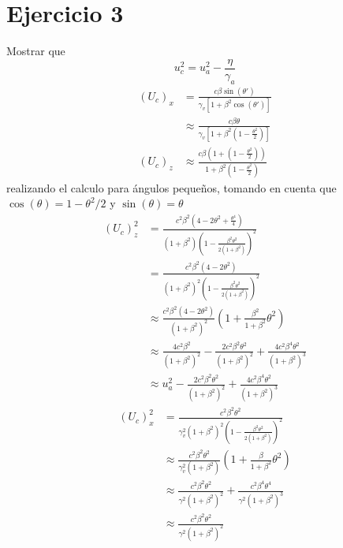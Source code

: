 \section*{Ejercicio 3}
Mostrar que
    \begin{equation*}
        u_c^2 = u_a^2 - \frac{\eta}{\gamma_a}
    \end{equation*}
    \begin{align*}
        (U_c)_x &= \frac{c\beta \sin({\theta}')}{\gamma_v \left[1+\beta^2 \cos({\theta}') \right]}\\
        & \approx \frac{c \beta  \theta}{\gamma_v \left[1+\beta^2 \left(1- \frac{\theta^2}{2} \right) \right]}\\
        (U_c)_z & \approx \frac{c \beta (1+\left(1-\frac{\theta^2}{2} \right))}{1+\beta^2\left(1-\frac{\theta^2}{2}\right)}
    \end{align*}
    realizando el calculo para ángulos pequeños, tomando en cuenta que $\cos(\theta)=1-\theta^2/2$ y $\sin(\theta)=\theta$
    \begin{align*}
        (U_c)_z^2 &= \frac{c^2 \beta^2 \left(4-2\theta^2+\frac{\theta^4}{4}\right)}{(1+\beta^2)\left(1- \frac{\beta^2 \theta^2}{2(1+\beta^2)}\right)^2}\\
        & = \frac{c^2 \beta^2 (4-2\theta^2)}{(1+\beta^2)^2 \left(1- \frac{\beta^2 \theta^2 }{2(1+\beta^2)}\right)^2}\\
        & \approx \frac{c^2 \beta^2 (4-2\theta^2)}{(1+\beta^2)^2} \left(1+ \frac{\beta^2}{1+\beta^2}\theta^2 \right)\\
        & \approx \frac{4c^2 \beta^2}{(1+\beta^2)^2} - \frac{2c^2 \beta^2 \theta^2}{(1+\beta^2)^2} + \frac{4c^2 \beta^4 \theta^2}{(1+\beta^2)^3}\\
        & \approx u_a^2 - \frac{2c^2 \beta^2 \theta^2}{(1+\beta^2)^2} + \frac{4c^2 \beta^4 \theta^2}{(1+\beta^2)^3} 
    \end{align*}
    \begin{align*}
        (U_c)_x^2 &= \frac{c^2 \beta^2 \theta^2}{\gamma_v^2 (1+\beta^2)^2 \left(1-\frac{\beta^2 \theta^2}{2(1+\beta^2)} \right)^2}\\
        &\approx \frac{c^2 \beta^2 \theta^2 }{\gamma^2_v (1+\beta^2)} \left(1+\frac{\beta}{1+\beta^2}\theta^2 \right)\\
        &\approx \frac{c^2 \beta^2 \theta^2}{\gamma^2 (1+\beta^2)^2} + \frac{c^2 \beta^4 \theta^4}{\gamma^2 (1+\beta^2)^3}\\
        &\approx \frac{c^2 \beta^2 \theta^2}{\gamma^2 (1+\beta^2)^2}
    \end{align*}
